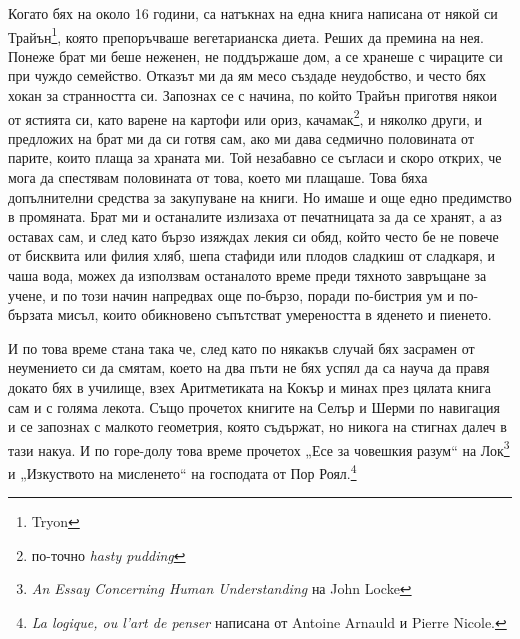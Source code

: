 \documentclass[12pt]{book}
\begin{document}
Когато бях на около 16 години, са натъкнах на една книга написана от някой си Трайън\footnote{Tryon}, която препоръчваше вегетарианска диета. Реших да премина на нея. Понеже брат ми беше неженен, не поддържаше дом, а се хранеше с чираците си при чуждо семейство. Отказът ми да ям месо създаде неудобство, и често бях хокан за странността си. Запознах се с начина, по който Трайън приготвя някои от ястията си, като варене на картофи или ориз, качамак\footnote{по-точно \textit{hasty pudding}}, и няколко други, и предложих на брат ми да си готвя сам, ако ми дава седмично половината от парите, които плаща за храната ми. Той незабавно се съгласи и скоро открих, че мога да спестявам половината от това, което ми плащаше. Това бяха допълнителни средства за закупуване на книги. Но имаше и още едно предимство в промяната. Брат ми и останалите излизаха от печатницата за да се хранят, а аз оставах сам, и след като бързо изяждах лекия си обяд, който често бе не повече от бисквита или филия хляб, шепа стафиди или плодов сладкиш от сладкаря, и чаша вода, можех да използвам останалото време преди тяхното завръщане за учене, и по този начин напредвах още по-бързо, поради по-бистрия ум и по-бързата мисъл, които обикновено съпътстват умереността в яденето и пиенето.

И по това време стана така че, след като по някакъв случай бях засрамен от неумението си да смятам, което на два пъти не бях успял да са науча да правя докато бях в училище, взех Аритметиката на Кокър и минах през цялата книга сам и с голяма лекота. Също прочетох книгите на Селър и Шерми по навигация и се запознах с малкото геометрия, която съдържат, но никога на стигнах далеч в тази накуа. И по горе-долу това време прочетох  „Есе за човешкия разум“ на Лок\footnote{\textit{An Essay Concerning Human Understanding} на John Locke} и „Изкуството на мисленето“ на господата от Пор Роял.\footnote{\textit{La logique, ou l'art de penser} написана от Antoine Arnauld и Pierre Nicole.} 
\end{document}
